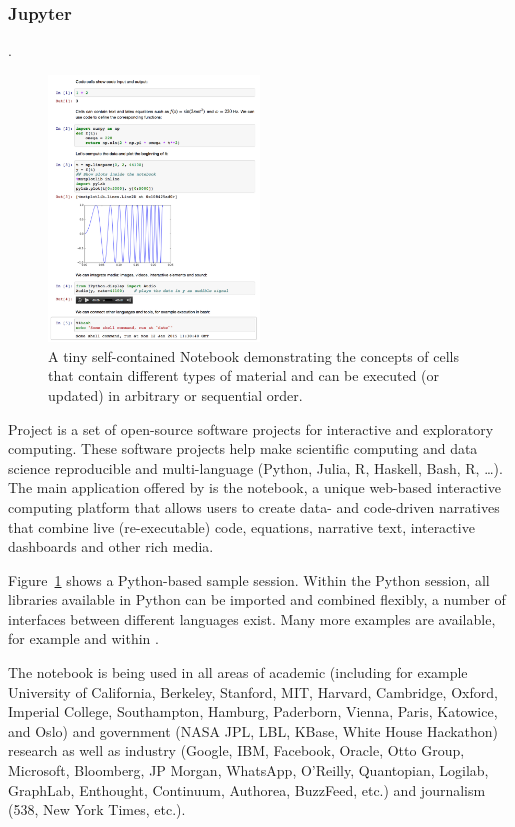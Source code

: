 \subsubsection{Jupyter}
\label{sec:jupyter}
.
\begin{figure}
\includegraphics[width=0.5\textwidth]{Pictures/jupyterdemo1.png}
\caption{\label{fig:jupyterdemo} A tiny self-contained Notebook demonstrating the concepts of cells that contain different types of material and can be executed (or updated) in arbitrary or sequential order.}
\end{figure}

Project \Jupyter is a set of open-source software projects for
interactive and exploratory computing. These software projects help
make scientific computing and data science reproducible and
multi-language (Python, Julia, R, Haskell, Bash, R, \ldots). The main
application offered by \Jupyter is the \Jupyter notebook, a unique
web-based interactive computing platform that allows users to create
data- and code-driven narratives that combine live (re-executable)
code, equations, narrative text, interactive dashboards and other rich
media. 

Figure~\ref{fig:jupyterdemo} shows a Python-based sample
session. Within the Python session, all libraries available in Python
can be imported and combined flexibly, a number of interfaces between
different languages exist. Many more examples are available, for
example \cite{IPython-demo-hyperbolic-conservation-laws} and
within \cite{IPython-sload-foundation-report-2013}.

The \Jupyter notebook is being used in all areas of academic
(including for example University of California, Berkeley, Stanford,
MIT, Harvard, Cambridge, Oxford, Imperial College, Southampton,
Hamburg, Paderborn, Vienna, Paris, Katowice, and Oslo) and government
(NASA JPL, LBL, KBase, White House Hackathon) research as well as
industry (Google, IBM, Facebook, Oracle, Otto Group, Microsoft,
Bloomberg, JP Morgan, WhatsApp, O’Reilly, Quantopian, Logilab,
GraphLab, Enthought, Continuum, Authorea, BuzzFeed, etc.)  and
journalism (538, New York Times, etc.). 

